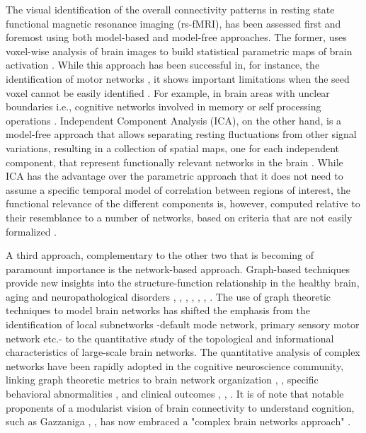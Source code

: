 \documentclass[12pt,a4paper]{article}
\begin{document}
The visual identification of the
overall connectivity patterns in resting state functional magnetic resonance
imaging (rs-fMRI), has been assessed first and foremost using both model-based and model-free
approaches. The former, uses voxel-wise analysis of brain images to build statistical parametric maps of brain activation \cite{biswal_functional_1995}. 
While this approach has been successful in, for instance, 
the identification of motor networks \cite{robinson_resting_2009}, it shows important limitations when
the seed voxel cannot be easily identified \cite{maldjian_functional_2001}.  
For example, in brain areas with unclear boundaries i.e., cognitive networks involved in memory or self processing operations \cite{fingelkurts_persistent_2011}. 
Independent Component Analysis (ICA), on
the other hand, is a model-free approach that allows separating resting
fluctuations from other signal variations, resulting in a collection of spatial
maps, one for each independent component, that represent functionally relevant networks in the brain
\cite{calhoun_review_2009}.
While ICA has the advantage over the parametric approach that it does not need to
assume a specific temporal model of correlation between regions of
interest, the functional relevance of the different components is, however,
computed relative to their resemblance to a number of networks, based on
criteria that are not easily formalized \cite{biswal_toward_2010}.

A third approach, complementary to the other two that is becoming of paramount importance is the network-based approach. Graph-based techniques provide new
insights into the structure-function relationship in the healthy brain, aging and neuropathological disorders \cite{fair_functional_2009}, 
\cite{wang_graph-based_2010}, \cite{he_graph_2010}, \cite{wang_graph_2011}, \cite{yu_altered_2011}, \cite{brier_functional_2014}, \cite{sala-llonch_changes_2014}. 
The use of graph theoretic techniques to model brain networks has shifted the 
emphasis from the identification of local subnetworks -default mode network,
primary sensory motor network etc.- to the quantitative study of the topological
and informational characteristics of large-scale brain networks.
The quantitative analysis of complex networks have been rapidly adopted in the cognitive neuroscience community, linking graph theoretic metrics  to brain network organization \cite{bullmore_complex_2009}, \cite{sporns_contributions_2014},  specific behavioral abnormalities \cite{tschernegg_abnormalities_2013}, \cite{cocchi_functional_2012} and  clinical outcomes \cite{yuan_structural_2015}, \cite{anderson_abnormal_2013}, \cite{dickerson_large-scale_2009} . It is of note that notable proponents of a modularist vision of brain
connectivity to understand cognition, such as Gazzaniga
\cite{gazzaniga_new_1999}, \cite{Fuster:2000}, has
now embraced a "complex brain networks approach" \cite{bassett_understanding_2011}. 
\end{document}
